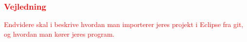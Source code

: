 




\subsubsection{\textcolor{red}{Vejledning}}

\textcolor{red}{Endvidere skal i beskrive hvordan man importerer jeres projekt i Eclipse fra git, og hvordan man kører jeres program.}